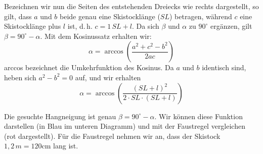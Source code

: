 Bezeichnen wir nun die Seiten des entstehenden Dreiecks wie rechts dargestellt, so gilt, dass $a$ und $b$ beide genau eine Skistocklänge ($SL$) betragen, während $c$ eine Skistocklänge plus $l$ ist, d.\,h. $c=1 \, SL+l$. Da sich $\beta$ und $\alpha$ zu $90^{\circ}$ ergänzen, gilt $\beta=90^{\circ}-\alpha$. Mit dem Kosinussatz erhalten wir: 
\begin{equation*}
	\alpha=\arccos\left(\frac{a^2+c^2-b^2}{2ac}\right)
\end{equation*}
arccos bezeichnet die Umkehrfunktion des Kosinus. 
Da $a$ und $b$ identisch sind, heben sich $a^2-b^2=0$ auf, und wir erhalten 
\begin{equation*}
	\alpha=\arccos\left(\frac{(SL+l)^2}{2 \cdot SL \cdot (SL+l)}\right)
\end{equation*} 

Die gesuchte Hangneigung ist genau $\beta = 90^{\circ}-\alpha$. Wir können diese Funktion darstellen (in Blau im unteren Diagramm) und mit der Faustregel vergleichen (rot dargestellt). Für die Faustregel nehmen wir an, dass der Skistock $1{,}2 \, \unit{m}=120\unit{\cm}$ lang ist.


